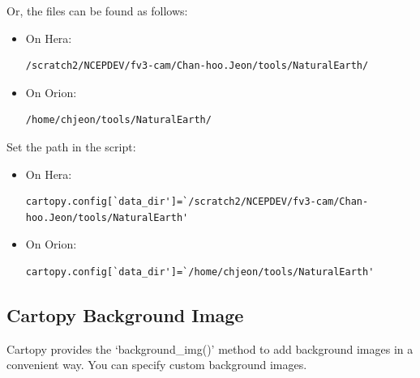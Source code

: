 \documentclass[11pt,fleqn]{report}              %
\begin{document}
Or, the files can be found as follows: 
\begin{itemize}
\item On Hera:
\lstset{language=bash}   
\begin{lstlisting}[frame=trBL]
/scratch2/NCEPDEV/fv3-cam/Chan-hoo.Jeon/tools/NaturalEarth/
\end{lstlisting}

\item On Orion:
\lstset{language=bash}   
\begin{lstlisting}[frame=trBL]
/home/chjeon/tools/NaturalEarth/
\end{lstlisting}

\end{itemize}


Set the path in the script:
\begin{itemize}
\item On Hera:
\lstset{language=bash}   
\begin{lstlisting}[frame=trBL]
cartopy.config[`data_dir']=`/scratch2/NCEPDEV/fv3-cam/Chan-hoo.Jeon/tools/NaturalEarth'
\end{lstlisting}

\item On Orion:
\lstset{language=bash}   
\begin{lstlisting}[frame=trBL]
cartopy.config[`data_dir']=`/home/chjeon/tools/NaturalEarth'
\end{lstlisting}

\end{itemize}



\subsection{Cartopy Background Image}

Cartopy provides the `background\_img()' method to add background images in a convenient way. You can specify custom background images.
\end{document}
